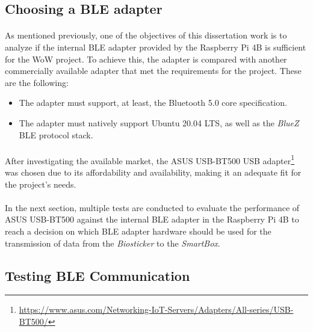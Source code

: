 \subsection{Choosing a \acs{BLE} adapter} 

\paragraph{} As mentioned previously, one of the objectives of this dissertation work is to analyze if the internal \acs{BLE} adapter provided by the Raspberry Pi 4B is sufficient for the \acs{WoW} project. To achieve this, the adapter is compared with another commercially available adapter that met the requirements for the project. These are the following:

\begin{itemize}
    \item The adapter must support, at least, the Bluetooth 5.0 core specification.
    \item The adapter must natively support Ubuntu 20.04 LTS, as well as the \textit{BlueZ} \acs{BLE} protocol stack. 
\end{itemize}

\paragraph{} After investigating the available market, the ASUS USB-BT500 USB adapter\footnote{\url{https://www.asus.com/Networking-IoT-Servers/Adapters/All-series/USB-BT500/}} was chosen due to its affordability and availability, making it an adequate fit for the project's needs.

\paragraph{} In the next section, multiple tests are conducted to evaluate the performance of ASUS USB-BT500 against the internal \acs{BLE} adapter in the Raspberry Pi 4B to reach a decision on which BLE adapter hardware should be used for the transmission of data from the \textit{Biosticker} to the \textit{SmartBox}.

\subsection{Testing \acs{BLE} Communication} 

